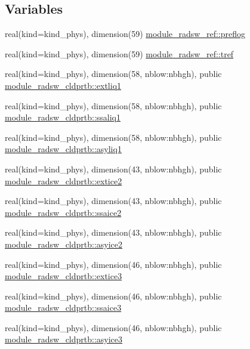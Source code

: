 \subsection*{Variables}
\begin{DoxyCompactItemize}
\item 
real(kind=kind\+\_\+phys), dimension(59) \hyperlink{namespacemodule__radsw__ref_afb71559d084ca709bd134e6c489035e2}{module\+\_\+radsw\+\_\+ref\+::preflog}
\item 
real(kind=kind\+\_\+phys), dimension(59) \hyperlink{namespacemodule__radsw__ref_a449fffa7047caa0fba6c166c26f7dbbd}{module\+\_\+radsw\+\_\+ref\+::tref}
\item 
real(kind=kind\+\_\+phys), dimension(58, nblow\+:nbhgh), public \hyperlink{namespacemodule__radsw__cldprtb_ac68593a33577c720ca8c74eafb3c9f96}{module\+\_\+radsw\+\_\+cldprtb\+::extliq1}
\item 
real(kind=kind\+\_\+phys), dimension(58, nblow\+:nbhgh), public \hyperlink{namespacemodule__radsw__cldprtb_a7944084ba9f240723dc93467ec66f825}{module\+\_\+radsw\+\_\+cldprtb\+::ssaliq1}
\item 
real(kind=kind\+\_\+phys), dimension(58, nblow\+:nbhgh), public \hyperlink{namespacemodule__radsw__cldprtb_a430be0720aa2e2ac46aa1ec7c9a9b64b}{module\+\_\+radsw\+\_\+cldprtb\+::asyliq1}
\item 
real(kind=kind\+\_\+phys), dimension(43, nblow\+:nbhgh), public \hyperlink{namespacemodule__radsw__cldprtb_a8ed403302034ea073243157749673e14}{module\+\_\+radsw\+\_\+cldprtb\+::extice2}
\item 
real(kind=kind\+\_\+phys), dimension(43, nblow\+:nbhgh), public \hyperlink{namespacemodule__radsw__cldprtb_a48555ff54d3a46f8c49733ff82e94d70}{module\+\_\+radsw\+\_\+cldprtb\+::ssaice2}
\item 
real(kind=kind\+\_\+phys), dimension(43, nblow\+:nbhgh), public \hyperlink{namespacemodule__radsw__cldprtb_ad9328ffc5e90cc62c8c9c5089b55fc79}{module\+\_\+radsw\+\_\+cldprtb\+::asyice2}
\item 
real(kind=kind\+\_\+phys), dimension(46, nblow\+:nbhgh), public \hyperlink{namespacemodule__radsw__cldprtb_a8b8bae831aa5b460e260c94e7f24f4c7}{module\+\_\+radsw\+\_\+cldprtb\+::extice3}
\item 
real(kind=kind\+\_\+phys), dimension(46, nblow\+:nbhgh), public \hyperlink{namespacemodule__radsw__cldprtb_a39b045b05e6bc9c04603277654ff8fc6}{module\+\_\+radsw\+\_\+cldprtb\+::ssaice3}
\item 
real(kind=kind\+\_\+phys), dimension(46, nblow\+:nbhgh), public \hyperlink{namespacemodule__radsw__cldprtb_aec2685be0de3a557aca169062cf1055e}{module\+\_\+radsw\+\_\+cldprtb\+::asyice3}

\end{DoxyCompactItemize}
